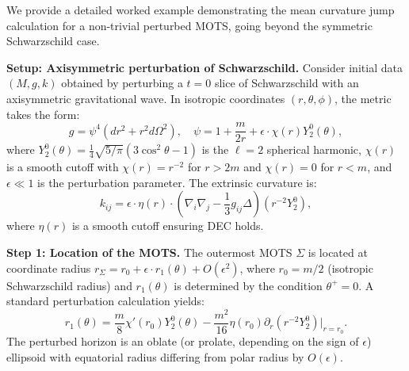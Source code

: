 \begin{example}\label{ex:PerturbedMOTS}
We provide a detailed worked example demonstrating the mean curvature jump calculation for a non-trivial perturbed MOTS, going beyond the symmetric Schwarzschild case.

\textbf{Setup: Axisymmetric perturbation of Schwarzschild.}
Consider initial data $(M, g, k)$ obtained by perturbing a $t = 0$ slice of Schwarzschild with an axisymmetric gravitational wave. In isotropic coordinates $(r, \theta, \phi)$, the metric takes the form:
\begin{equation}
    g = \psi^4 \left( dr^2 + r^2 d\Omega^2 \right), \quad \psi = 1 + \frac{m}{2r} + \epsilon \cdot \chi(r) Y_2^0(\theta),
\end{equation}
where $Y_2^0(\theta) = \frac{1}{4}\sqrt{5/\pi}(3\cos^2\theta - 1)$ is the $\ell = 2$ spherical harmonic, $\chi(r)$ is a smooth cutoff with $\chi(r) = r^{-2}$ for $r > 2m$ and $\chi(r) = 0$ for $r < m$, and $\epsilon \ll 1$ is the perturbation parameter. The extrinsic curvature is:
\begin{equation}
    k_{ij} = \epsilon \cdot \eta(r) \cdot \left( \nabla_i \nabla_j - \frac{1}{3} g_{ij} \Delta \right) (r^{-2} Y_2^0),
\end{equation}
where $\eta(r)$ is a smooth cutoff ensuring DEC holds.

\textbf{Step 1: Location of the MOTS.}
The outermost MOTS $\Sigma$ is located at coordinate radius $r_\Sigma = r_0 + \epsilon \cdot r_1(\theta) + O(\epsilon^2)$, where $r_0 = m/2$ (isotropic Schwarzschild radius) and $r_1(\theta)$ is determined by the condition $\theta^+ = 0$. A standard perturbation calculation yields:
\begin{equation}
    r_1(\theta) = \frac{m}{8} \chi'(r_0) Y_2^0(\theta) - \frac{m^2}{16} \eta(r_0) \partial_r(r^{-2} Y_2^0)|_{r=r_0}.
\end{equation}
The perturbed horizon is an oblate (or prolate, depending on the sign of $\epsilon$) ellipsoid with equatorial radius differing from polar radius by $O(\epsilon)$.


\end{example}
